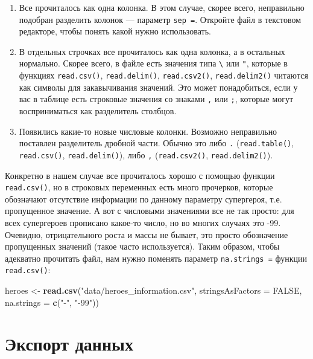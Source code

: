 \documentclass[]{book}
\newenvironment{Shaded}{\begin{snugshade}}{\end{snugshade}}
\newcommand{\KeywordTok}[1]{\textcolor[rgb]{0.13,0.29,0.53}{\textbf{#1}}}
\newcommand{\DataTypeTok}[1]{\textcolor[rgb]{0.13,0.29,0.53}{#1}}
\newcommand{\StringTok}[1]{\textcolor[rgb]{0.31,0.60,0.02}{#1}}
\newcommand{\OtherTok}[1]{\textcolor[rgb]{0.56,0.35,0.01}{#1}}
\newcommand{\NormalTok}[1]{#1}
\begin{document}
\begin{enumerate}
\def\labelenumi{\arabic{enumi}.}
\setcounter{enumi}{4}
\item
  Все прочиталось как одна колонка. В этом случае, скорее всего,
  неправильно подобран разделить колонок --- параметр \texttt{sep\ =}.
  Откройте файл в текстовом редакторе, чтобы понять какой нужно
  использовать.
\item
  В отдельных строчках все прочиталось как одна колонка, а в остальных
  нормально. Скорее всего, в файле есть значения типа
  \texttt{\textbackslash{}} или \texttt{"}, которые в функциях
  \texttt{read.csv()}, \texttt{read.delim()}, \texttt{read.csv2()},
  \texttt{read.delim2()} читаются как символы для закавычивания
  значений. Это может понадобиться, если у вас в таблице есть строковые
  значения со знаками \texttt{,} или \texttt{;}, которые могут
  восприниматься как разделитель столбцов.
\item
  Появились какие-то новые числовые колонки. Возможно неправильно
  поставлен разделитель дробной части. Обычно это либо \texttt{.}
  (\texttt{read.table()}, \texttt{read.csv()}, \texttt{read.delim()}),
  либо \texttt{,} (\texttt{read.csv2()}, \texttt{read.delim2()}).
\end{enumerate}

Конкретно в нашем случае все прочиталось хорошо с помощью функции
\texttt{read.csv()}, но в строковых переменных есть много прочерков,
которые обозначают отсутствие информации по данному параметру
супергероя, т.е. пропущенное значение. А вот с числовыми значениями все
не так просто: для всех супергероев прописано какое-то число, но во
многих случаях это -99. Очевидно, отрицательного роста и массы не
бывает, это просто обозначение пропущенных значений (такое часто
используется). Таким образом, чтобы адекватно прочитать файл, нам нужно
поменять параметр \texttt{na.strings\ =} функции \texttt{read.csv()}:

\begin{Shaded}
\begin{Highlighting}[]
\NormalTok{heroes <-}\StringTok{ }\KeywordTok{read.csv}\NormalTok{(}\StringTok{"data/heroes_information.csv"}\NormalTok{, }
                   \DataTypeTok{stringsAsFactors =} \OtherTok{FALSE}\NormalTok{,}
                   \DataTypeTok{na.strings =} \KeywordTok{c}\NormalTok{(}\StringTok{"-"}\NormalTok{, }\StringTok{"-99"}\NormalTok{))}
\end{Highlighting}
\end{Shaded}

\section{Экспорт данных}\label{export_data}
\end{document}

